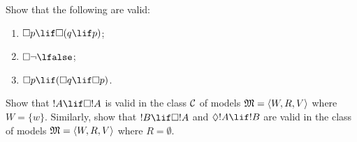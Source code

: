 \documentclass[../../../include/open-logic-section]{subfiles}
\begin{document}
\begin{prob}
  Show that the following are valid:
  \begin{enumerate}
  \item $\Box p \lif \Box (q \lif p)$;
  \item $\Box \lnot \lfalse$;
  \item $\Box p \lif (\Box q \lif \Box p)$.
  \end{enumerate}
\end{prob}

\begin{prob}
  Show that $!A \lif \Box!A$ is valid in the class $\mathcal{C}$ of
  models $\mModel{M} = \tuple{W, R, V}$ where $W = \{w\}$. Similarly,
  show that $!B \lif \Box !A$ and $\Diamond !A \lif !B$ are valid in
  the class of models $\mModel{M} = \tuple{W, R, V}$ where
  $R = \emptyset$.
\end{prob}
\end{document}
